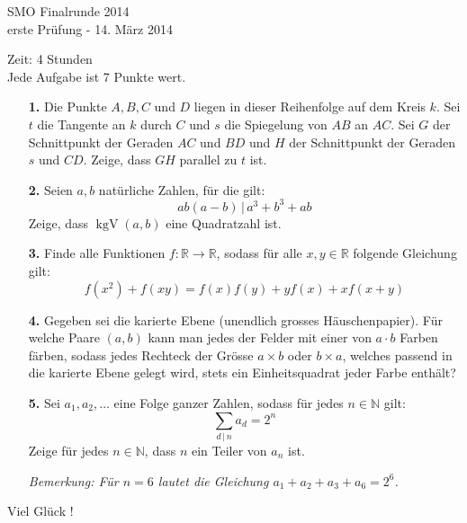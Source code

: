 \documentclass[11pt,a4paper]{article}
\theoremstyle{plain}
\theoremstyle{definition}
\DeclareMathOperator{\kgV}{kgV}
\renewcommand{\div}{\, | \,}
\newcommand{\R}{\mathbb{R}}
\newcommand{\N}{\mathbb{N}}
\begin{document}
\pagestyle{empty}

\begin{center}
{\huge SMO Finalrunde 2014} \\
\medskip erste Prüfung - 14. März 2014
\end{center}
\vspace{8mm}
Zeit: 4 Stunden\\
Jede Aufgabe ist 7 Punkte wert.

\vspace{15mm}

\begin{enumerate}
\item[\textbf{1.}]
Die Punkte $A, B, C$ und $D$ liegen in dieser Reihenfolge auf dem Kreis $k$. Sei $t$ die Tangente an $k$ durch $C$ und $s$ die Spiegelung von $AB$ an $AC$. Sei $G$ der Schnittpunkt der Geraden $AC$ und $BD$ und $H$ der Schnittpunkt der Geraden $s$ und $CD$. Zeige, dass $GH$ parallel zu $t$ ist.

\bigskip

\item[\textbf{2.}]
Seien $a,b$ natürliche Zahlen, für die gilt:
\[ab(a-b)\div a^3+b^3+ab\]
Zeige, dass $\kgV(a,b)$ eine Quadratzahl ist.

\bigskip

\item[\textbf{3.}] 
Finde alle Funktionen $f:\R \rightarrow \R$, sodass für alle $x,y \in \R$ folgende Gleichung gilt:
\[
f(x^2) + f(xy)=f(x)f(y)+yf(x)+xf(x+y)
\]

\bigskip

\item[\textbf{4.}]
Gegeben sei die karierte Ebene (unendlich grosses Häuschenpapier). Für welche Paare $(a,b)$ kann man jedes der Felder mit einer von $a\cdot b$ Farben färben, sodass jedes Rechteck der Grösse $a \times b$ oder $b \times a$, welches passend in die karierte Ebene gelegt wird, stets ein Einheitsquadrat jeder Farbe enthält?

\bigskip

\item[\textbf{5.}]
Sei $a_1, a_2, \ldots$ eine Folge ganzer Zahlen, sodass für jedes $n \in \N$ gilt:
 \[
\sum_{d\div n}a_d = 2^n
\]
Zeige für jedes $n \in \N$, dass $n$ ein Teiler von $a_n$ ist.

\emph{Bemerkung: Für $n=6$ lautet die Gleichung $a_1+a_2+a_3+a_6=2^6$.}
\end{enumerate}
\bigskip
\begin{center}
Viel Glück !
\end{center}
\end{document}
